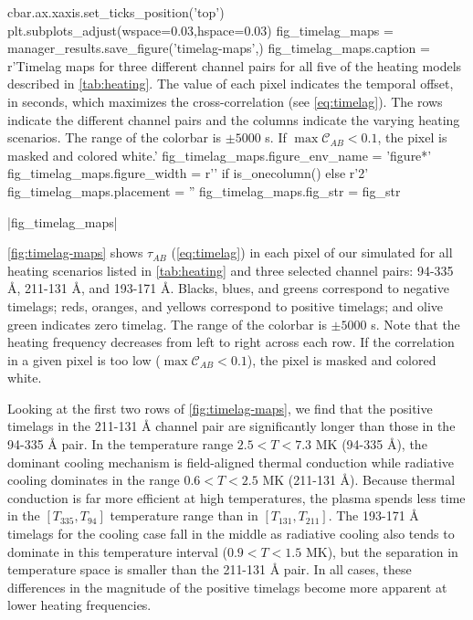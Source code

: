 \begin{pycode}
            cbar.ax.xaxis.set_ticks_position('top')
plt.subplots_adjust(wspace=0.03,hspace=0.03)
fig_timelag_maps = manager_results.save_figure('timelag-maps',)
fig_timelag_maps.caption = r'Timelag maps for three different channel pairs for all five of the heating models described in \autoref{tab:heating}. The value of each pixel indicates the temporal offset, in seconds, which maximizes the cross-correlation (see \autoref{eq:timelag}). The rows indicate the different channel pairs and the columns indicate the varying heating scenarios. The range of the colorbar is $\pm5000$ s. If $\max{\mathcal{C}_{AB}}<0.1$, the pixel is masked and colored white.'
fig_timelag_maps.figure_env_name = 'figure*'
fig_timelag_maps.figure_width = r'\columnwidth' if is_onecolumn() else r'2\columnwidth'
fig_timelag_maps.placement = ''
fig_timelag_maps.fig_str = fig_str
\end{pycode}
|fig_timelag_maps|

\autoref{fig:timelag-maps} shows $\tau_{AB}$ (\autoref{eq:timelag}) in each pixel of our simulated \AR{} for all heating scenarios listed in \autoref{tab:heating} and three selected channel pairs: 94-335 \AA{}, 211-131 \AA{}, and 193-171 \AA{}. Blacks, blues, and greens correspond to negative timelags; reds, oranges, and yellows correspond to positive timelags; and olive green indicates zero timelag. The range of the colorbar is $\pm5000$ s. Note that the heating frequency decreases from left to right across each row. If the correlation in a given pixel is too low ($\max{\mathcal{C}_{AB}}<0.1$), the pixel is masked and colored white.

Looking at the first two rows of \autoref{fig:timelag-maps}, we find that the positive timelags in the 211-131 \AA{} channel pair are significantly longer than those in the 94-335 \AA{} pair. In the temperature range $2.5<T<7.3$ MK (94-335 \AA{}), the dominant cooling mechanism is field-aligned thermal conduction while radiative cooling dominates in the range $0.6<T<2.5$ MK (211-131 \AA{}). Because thermal conduction is far more efficient at high temperatures, the plasma spends less time in the $[T_{335},T_{94}]$ temperature range than in $[T_{131},T_{211}]$. The 193-171 \AA{} timelags for the cooling case fall in the middle as radiative cooling also tends to dominate in this temperature interval ($0.9<T<1.5$ MK), but the separation in temperature space is smaller than the 211-131 \AA{} pair. In all cases, these differences in the magnitude of the positive timelags become more apparent at lower heating frequencies.

